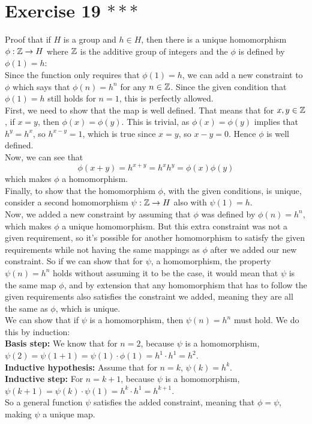 \documentclass[12pt]{article}
\begin{document}
    \section*{Exercise 19 $***$}
    Proof that if $H$ is a group and $h \in H$,
    then there is a unique homomorphism $\phi: \mathbb{Z} \to H$
    where $\mathbb{Z}$ is the additive group of integers
    and the $\phi$ is defined by $\phi(1) = h$: \\
    Since the function only requires that $\phi(1) = h$,
    we can add a new constraint to $\phi$ which says that 
    $\phi(n) = h^n$ for any $n \in \mathbb{Z}$.
    Since the given condition that $\phi(1) = h$ still holds for $n = 1$,
    this is perfectly allowed. \\
    First, we need to show that the map is well defined.
    That means that for $x, y \in \mathbb{Z}$, if $x = y$,
    then $\phi(x) = \phi(y)$.
    This is trivial,
    as $\phi(x) = \phi(y)$ implies that $h^y = h^x$,
    so $h^{x - y} = 1$,
    which is true since $x = y$,
    so $x - y = 0$.
    Hence $\phi$ is well defined. \\
    Now, we can see that
    \[ \phi(x + y) = h^{x + y}
    = h^xh^y
    = \phi(x)\phi(y) \]
    which makes $\phi$ a homomorphism. \\
    Finally, to show that the homomorphism $\phi$, with the given conditions,
    is unique,
    consider a second homomorphism $\psi: \mathbb{Z} \to H$
    also with $\psi(1) = h$. \\
    Now, we added a new constraint by assuming that $\phi$ was
    defined by $\phi(n) = h^n$,
    which makes $\phi$ a unique homomorphism.
    But this extra constraint was not a given requirement,
    so it's possible for another homomorphism to satisfy
    the given requirements while not having the same mappings as $\phi$
    after we added our new constraint.
    So if we can show that for $\psi$, a homomorphism,
    the property $\psi(n) = h^n$ holds without assuming it to be the case,
    it would mean that $\psi$ is the same map $\phi$,
    and by extension that any homomorphism that has to follow the given
    requirements also satisfies the constraint we added,
    meaning they are all the same as $\phi$, which is unique. \\
    We can show that if $\psi$ is a homomorphism,
    then $\psi(n) = h^n$ must hold.
    We do this by induction: \\
    \textbf{Basis step:}
    We know that for $n = 2$,
    because $\psi$ is a homomorphism,
    $\psi(2) = \psi(1 + 1)
    = \psi(1) \cdot \phi(1) = h^1 \cdot h^1 = h^2$. \\
    \textbf{Inductive hypothesis:}
    Assume that for $n = k$, $\psi(k) = h^k$. \\ 
    \textbf{Inductive step:}
    For $n = k + 1$, because $\psi$ is a homomorphism,
    $\psi(k + 1) = \psi(k) \cdot \psi(1)
    = h^k \cdot h^1 = h^{k+1}$. \\
    So a general function $\psi$ satisfies the added constraint,
    meaning that $\phi = \psi$,
    making $\psi$ a unique map.
\end{document}
